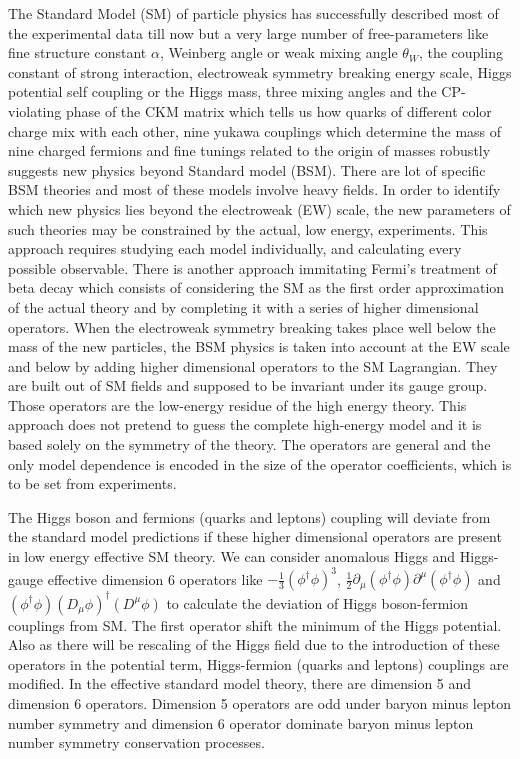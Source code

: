 \documentclass[final,3p]{CSP}
\begin{document}
The Standard Model (SM) of particle physics has successfully described most of the experimental data till now but a very large 
number of free-parameters like fine structure constant $\alpha$, Weinberg angle or weak mixing angle $\theta_W$, the coupling 
constant of strong interaction, electroweak symmetry breaking energy scale, Higgs potential self coupling or the Higgs mass, 
three mixing angles and the CP-violating phase of the CKM matrix which tells us how quarks of 
different color charge mix with 
each other, nine yukawa couplings which determine the mass of nine charged fermions and fine 
tunings related to the origin of 
masses robustly suggests new physics beyond Standard model (BSM). There are lot of specific 
BSM theories and most of these 
models involve heavy fields. In order to identify which new physics lies beyond the 
electroweak (EW) scale, the new parameters 
of such theories may be constrained by the actual, low energy, experiments. This approach 
requires studying each model 
individually, and calculating every possible observable. There is another approach immitating 
Fermi's treatment of beta decay 
which consists of considering the SM as the first order approximation of the actual theory 
and by completing it with a series 
of higher dimensional operators. When the electroweak symmetry breaking takes place well 
below the mass of the new particles, 
the BSM physics is taken into account at the EW scale and below by adding higher dimensional 
operators to the SM Lagrangian. 
They are built out of SM fields and supposed to be invariant under its gauge group. Those 
operators are the low-energy residue 
of the high energy theory. This approach does not pretend to guess the complete high-energy 
model and it is based solely on 
the symmetry of the  theory. The operators are general and the only model dependence is 
encoded in the size of the operator
coefficients, which is to be set from experiments.

The Higgs boson and fermions (quarks and leptons) coupling will deviate from the standard 
model predictions if these higher 
dimensional operators are present in low energy effective SM theory. We can consider 
anomalous Higgs and Higgs-gauge effective 
dimension 6 operators like $-\frac{1}{3}(\phi^{\dagger}\phi)^3$, $\frac{1}{2} \partial_{\mu} 
(\phi^{\dagger} \phi) 
\partial^{\mu}(\phi^{\dagger} \phi)$ and $(\phi^{\dagger} \phi)(D_{\mu} \phi)^{\dagger} 
(D^{\mu} \phi)$ to calculate the 
deviation of Higgs boson-fermion couplings from SM. The first operator shift the minimum of 
the Higgs potential. Also as there 
will be rescaling of the Higgs field due to the introduction of these operators in the 
potential term, Higgs-fermion (quarks 
and leptons) couplings are modified. In the effective standard model theory, there are 
dimension 5 and dimension 6 
operators. Dimension 5 operators are odd under baryon minus lepton number symmetry and 
dimension 6 operator dominate baryon 
minus lepton number symmetry conservation processes.
\end{document}
